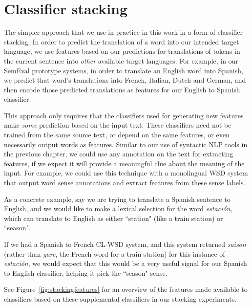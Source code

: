 \section{Classifier stacking}
The simpler approach that we use in practice in this work in a form of
classifier stacking. In order to predict the translation of a word into our
intended target language, we use features based on our predictions for
translations of tokens in the current sentence into \emph{other} available
target languages.
For example, in our SemEval prototype systems, in order to translate an
English word into Spanish, we predict that word's translations into French,
Italian, Dutch and German, and then encode those predicted translations as
features for our English to Spanish classifier.

This approach only requires that the classifiers used for generating new
features make \emph{some} prediction based on the input text. These classifiers 
need not be trained from the same source text, or depend on the same features,
or even necessarily output words as features. Similar to our use of syntactic
NLP tools in the previous chapter, we could use any annotation on the text for
extracting features, if we expect it will provide a meaningful clue about the
meaning of the input. For example, we could use this technique with a
monolingual WSD system that output word sense annotations and extract features
from these sense labels.

As a concrete example, say we are trying to translate a Spanish sentence to
English, and we would like to make a lexical selection for the word
\emph{estación}, which can translate to English as either ``station" (like a
train station) or ``season".

\label{sent:estacion}

If we had a Spanish to French CL-WSD system, and this system returned
\emph{saison} (rather than \emph{gare}, the French word for a train station)
for this instance of \emph{estación}, we would expect that this would be a very
useful signal for our Spanish to English classifier, helping it pick the
``season" sense.

See Figure~\ref{fig:stackingfeatures} for an overview of the features made
available to classifiers based on these supplemental classifiers in our
stacking experiments.

